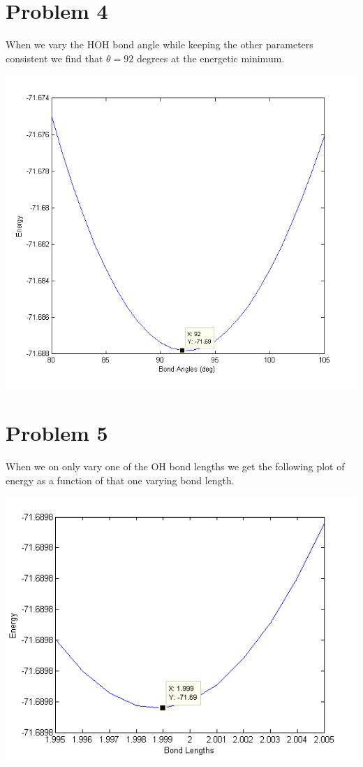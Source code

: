 \documentclass{article}
\begin{document}
\section*{Problem 4}
When we vary the HOH bond angle while keeping the other parameters consistent we find that $\theta = 92$ degrees at the energetic minimum.
\begin{center}
  \includegraphics[scale=0.5]{prob4.png}
\end{center}


\section*{Problem 5}
When we on only vary one of the OH bond lengths we get the following plot of energy as a function of that one varying bond length.
\begin{center}
  \includegraphics[scale=0.5]{prob5.png}
\end{center}
\end{document}
